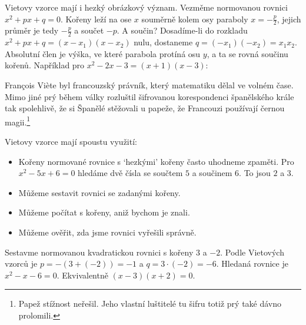 Vietovy vzorce mají i hezký obrázkový význam. Vezměme normovanou rovnici $x^2 + px + q = 0$. Kořeny leží na ose $x$ souměrně kolem osy paraboly $x = -\frac{p}{2}$, jejich průměr je tedy $-\frac{p}{2}$ a součet $-p$. A součin? Dosadíme-li do rozkladu $x^2 + px + q = (x - x_1)(x - x_2)$ nulu, dostaneme $q = (-x_1)(-x_2) = x_1x_2$. Absolutní člen je výška, ve které parabola protíná osu $y$, a ta se rovná součinu kořenů. Například pro $x^2 - 2x - 3 = (x + 1)(x - 3)$:
\begin{center}
\end{center}

François Viète byl francouzský právník, který matematiku dělal ve volném čase. Mimo jiné prý během války rozluštil šifrovanou korespondenci španělského krále tak spolehlivě, že si Španělé stěžovali u papeže, že Francouzi používají černou magii.\footnote{Papež stížnost neřešil. Jeho vlastní luštitelé tu šifru totiž prý také dávno prolomili.}

Vietovy vzorce mají spoustu využití:
\begin{itemize}
  \item Kořeny normované rovnice s `hezkými' kořeny často uhodneme zpaměti. Pro $x^2 - 5x + 6 = 0$ hledáme dvě čísla se součtem $5$ a součinem $6$. To jsou $2$ a $3$.
  \item Můžeme sestavit rovnici se zadanými kořeny.
  \item Můžeme počítat s kořeny, aniž bychom je znali.
  \item Můžeme ověřit, zda jsme rovnici vyřešili správně.
\end{itemize}

\begin{example}
  Sestavme normovanou kvadratickou rovnici s kořeny $3$ a $-2$. Podle Vietových vzorců je $p = -(3 + (-2)) = -1$ a $q = 3\cdot(-2) = -6$. Hledaná rovnice je $x^2 - x - 6 = 0$. Ekvivalentně $(x - 3)(x + 2) = 0$.
\end{example}

